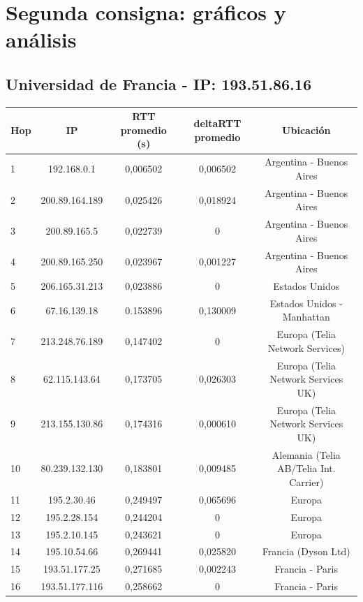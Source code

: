 \section{Segunda consigna: gráficos y análisis}

\subsection{Universidad de Francia - IP: 193.51.86.16}

\bigskip

\begin{tabular}{ | l | c | c | c | c |}
 \hline                 
   Hop & IP &  RTT promedio (s)  & deltaRTT promedio & Ubicación\\
 \hline 
   1 & 192.168.0.1 & 0,006502 & 0,006502 & Argentina - Buenos Aires\\ 
 \hline 
   2 & 200.89.164.189 & 0,025426 & 0,018924 & Argentina - Buenos Aires\\ 
  \hline 
   3 & 200.89.165.5 & 0,022739 & 0 & Argentina - Buenos Aires\\ 
  \hline 
   4 & 200.89.165.250 & 0,023967 & 0,001227 & Argentina - Buenos Aires\\ 
  \hline 
   5 & 206.165.31.213 & 0,023886 & 0 & Estados Unidos\\ 
  \hline 
   6 & 67.16.139.18 & 0.153896 & 0,130009 & Estados Unidos - Manhattan\\ 
  \hline 
   7 & 213.248.76.189 & 0,147402 & 0 & Europa (Telia Network Services)\\ 
  \hline 
   8 & 62.115.143.64 & 0,173705 & 0,026303 & Europa (Telia Network Services UK)\\ 
  \hline 
   9 & 213.155.130.86 & 0,174316 & 0,000610 & Europa (Telia Network Services UK)\\ 
  \hline 
   10 & 80.239.132.130 & 0,183801 & 0,009485 & Alemania (Telia AB/Telia Int. Carrier)\\ 
  \hline 
   11 & 195.2.30.46 & 0,249497 & 0,065696 & Europa\\ 
  \hline 
   12 & 195.2.28.154 & 0,244204 & 0 & Europa\\ 
  \hline 
   13 & 195.2.10.145 & 0,243621 & 0 & Europa\\ 
  \hline 
   14 & 195.10.54.66 & 0,269441 & 0,025820 & Francia (Dyson Ltd)\\ 
  \hline 
   15 & 193.51.177.25 & 0,271685 & 0,002243 & Francia - Paris\\ 
  \hline 
   16 & 193.51.177.116 & 0,258662 & 0 & Francia - Paris\\ 

\end{tabular}
